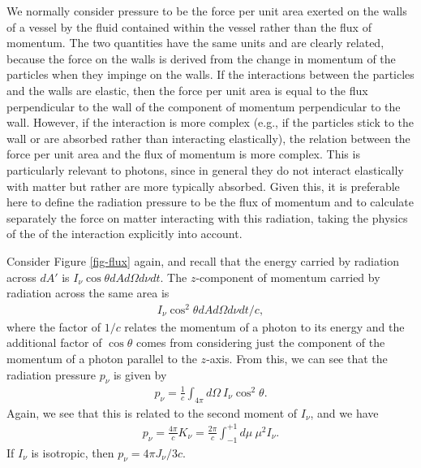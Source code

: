 We normally consider pressure to be the force per unit area
exerted on the walls of a vessel by the fluid contained
within the vessel rather than the flux of momentum. The two
quantities have the same units and are clearly related,
because the force on the walls is derived from the change in
momentum of the particles when they impinge on the walls. If the interactions between the particles and the walls are elastic, then the force per unit area is equal to the flux perpendicular to the wall of the component of momentum perpendicular to the wall. However, if the interaction is more complex (e.g., if the particles stick to the wall or are absorbed rather than interacting elastically), the relation between the force per unit area and the flux of momentum is more complex. This is particularly relevant to photons, since in general they do not interact elastically with matter but rather are more typically absorbed. Given this, it is preferable here to define the radiation pressure to be the flux of momentum and to calculate separately the force on matter interacting with this radiation, taking the physics of the of the interaction explicitly into account.


\newslide

Consider Figure
\ref{fig-flux} again, and recall that the energy carried by
radiation across $dA'$ is $I_\nu
\cos\theta dA d\Omega d\nu dt$. The $z$-component of
momentum carried by radiation across the same area is
\begin{align}
I_\nu \cos^2\theta dA d\Omega d\nu dt / c,
\end{align}
where the factor of
$1/c$ relates the momentum of a photon to its energy and the
additional factor of $\cos\theta$ comes from considering
just the component of the momentum of a photon parallel to
the $z$-axis. From this, we can see that the radiation
pressure $p_\nu$ is given by
\begin{align}
p_\nu = \frac{1}{c} \int_{4\pi}\!\!\!d\Omega\:I_\nu
\cos^2\theta.
\end{align}
Again, we see that this is related to the second moment of
$I_\nu$, and we have
\begin{align}
p_\nu= \frac{4\pi}{c} K_\nu =
\frac{2\pi}{c} \int_{-1}^{+1}\!\!\!d\mu\:\mu^2 I_\nu.
\end{align}
If $I_\nu$ is isotropic, then $p_\nu = {4\pi J_\nu / 3c}$.

\newslide


